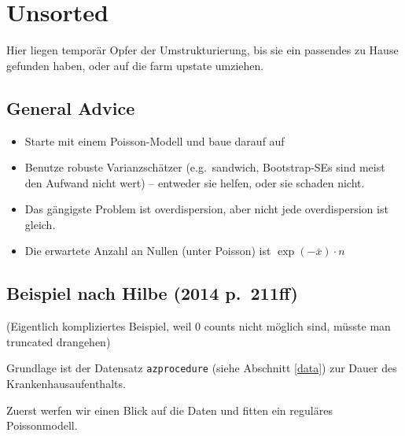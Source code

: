 \documentclass[ngerman,a4paper,]{scrartcl}
\newenvironment{Shaded}{\begin{snugshade}}{\end{snugshade}}
\newcommand{\DataTypeTok}[1]{\textcolor[rgb]{0.13,0.29,0.53}{#1}}
\newcommand{\KeywordTok}[1]{\textcolor[rgb]{0.13,0.29,0.53}{\textbf{#1}}}
\newcommand{\NormalTok}[1]{#1}
\newcommand{\OperatorTok}[1]{\textcolor[rgb]{0.81,0.36,0.00}{\textbf{#1}}}
\newcommand{\StringTok}[1]{\textcolor[rgb]{0.31,0.60,0.02}{#1}}
\providecommand{\tightlist}{%
  \setlength{\itemsep}{0pt}\setlength{\parskip}{0pt}}
\theoremstyle{definition}
\theoremstyle{definition}
\theoremstyle{definition}
\theoremstyle{remark}
\begin{document}
\hypertarget{unsorted}{%
\section{Unsorted}\label{unsorted}}

Hier liegen temporär Opfer der Umstrukturierung, bis sie ein passendes zu Hause gefunden haben, oder auf die farm upstate umziehen.

\hypertarget{general-advice}{%
\subsection{General Advice}\label{general-advice}}

\begin{itemize}
\tightlist
\item
  Starte mit einem Poisson-Modell und baue darauf auf
\item
  Benutze robuste Varianzschätzer (e.g.~sandwich, Bootstrap-SEs sind meist den Aufwand nicht wert) -- entweder sie helfen, oder sie schaden nicht.
\item
  Das gängigste Problem ist overdispersion, aber nicht jede overdispersion ist gleich.
\item
  Die erwartete Anzahl an Nullen (unter Poisson) ist \(\exp(-\bar{x}) \cdot n\)
\end{itemize}

\hypertarget{beispiel-nach-hilbe-2014-p.211ff}{%
\subsection{Beispiel nach Hilbe (2014 p.~211ff)}\label{beispiel-nach-hilbe-2014-p.211ff}}

(Eigentlich kompliziertes Beispiel, weil 0 counts nicht möglich sind, müsste man truncated drangehen)

Grundlage ist der Datensatz \texttt{azprocedure} (siehe Abschnitt \ref{data}) zur Dauer des Krankenhausaufenthalts.

Zuerst werfen wir einen Blick auf die Daten und fitten ein reguläres Poissonmodell.

\begin{Shaded}
\end{Shaded}
\end{document}
